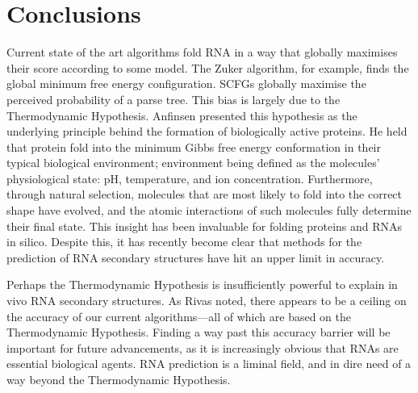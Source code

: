 \documentclass[12pt, a4paper]{article}
\begin{document}
\section{Conclusions}
Current state of the art algorithms fold RNA in a way that globally maximises their score according to some model. The Zuker algorithm, for example, finds the global minimum free energy configuration. SCFGs globally maximise the perceived probability of a parse tree. This bias is largely due to the Thermodynamic Hypothesis. Anfinsen \cite{anfinsen1973principles} presented this hypothesis as the underlying principle behind the formation of biologically active proteins. He held that protein fold into the minimum Gibbs free energy conformation in their typical biological environment; environment being defined as the molecules' physiological state: pH, temperature, and ion concentration. Furthermore, through natural selection, molecules that are most likely to fold into the correct shape have evolved, and the atomic interactions of such molecules fully determine their final state. This insight has been invaluable for folding proteins and RNAs in silico. Despite this, it has recently become clear that methods for the prediction of RNA secondary structures have hit an upper limit in accuracy.

Perhaps the Thermodynamic Hypothesis is insufficiently powerful to explain in vivo RNA secondary structures. As Rivas \cite{rivas2013four} noted, there appears to be a ceiling on the accuracy of our current algorithms---all of which are based on the Thermodynamic Hypothesis. Finding a way past this accuracy barrier will be important for future advancements, as it is increasingly obvious that RNAs are essential biological agents. RNA prediction is a liminal field, and in dire need of a way beyond the Thermodynamic Hypothesis.







\end{document}
